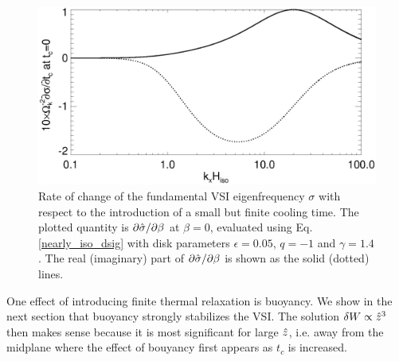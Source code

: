 \begin{figure}
  \includegraphics[width=\linewidth]{figures/domegadbeta}
  \caption{Rate of change of the fundamental VSI eigenfrequency
    $\sigma$ with respect to the introduction of a small but finite
    cooling time. The plotted quantity is $\partial\hat{\sigma}/\partial\beta$ at $\beta=0$, evaluated using
    Eq. \ref{nearly_iso_dsig} with 
    disk parameters $\epsilon=0.05$, $q=-1$ and $\gamma=1.4$. The real
    (imaginary) part of $\partial\hat{\sigma}/\partial\beta$ is shown as the solid
    (dotted) lines. 
    \label{domegadbeta}}  
\end{figure}   

One effect of introducing finite thermal relaxation is buoyancy. We
show in the next section that buoyancy strongly stabilizes the
VSI. The solution $\delta W\propto\hat{z}^3$ then makes sense because it
is most significant for large $\hat{z}$, i.e. away from the midplane
where the effect of bouyancy first appears as $t_c$ is increased. 